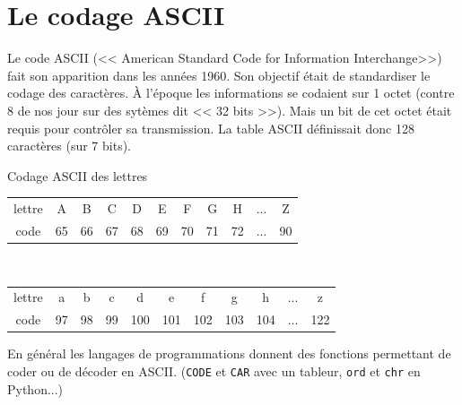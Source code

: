 \documentclass[a4paper,10pt]{report}
\theoremstyle{exo}
\theoremstyle{exercice}
\begin{document}
\section{Le codage ASCII}

Le code ASCII (<< American Standard Code for Information Interchange>>) fait son apparition dans les années 1960. Son objectif était de standardiser le codage des caractères. À l'époque les informations se codaient sur 1 octet (contre 8 de nos jour sur des sytèmes dit << 32 bits >>). Mais un bit de cet octet était requis pour contrôler sa transmission. La table ASCII définissait donc 128 caractères (sur 7 bits).

\begin{exemple*}{Codage ASCII des lettres}
\begin{center}\begin{tabular}{ccccccccccc}
lettre & A& B& C& D& E& F& G& H& ... & Z \\
code & 65& 66& 67& 68& 69& 70& 71& 72& ... & 90 \\
\end{tabular}

~

\begin{tabular}{ccccccccccc}
lettre & a& b& c& d& e& f& g& h& ... & z \\
code & 97& 98& 99& 100& 101& 102& 103& 104& ... & 122 \\
\end{tabular}
\end{center}
\end{exemple*}

En général les langages de programmations donnent des fonctions permettant de coder ou de décoder en ASCII. (\texttt{CODE} et \texttt{CAR} avec un tableur, \texttt{ord} et \texttt{chr} en Python...)
\end{document}
